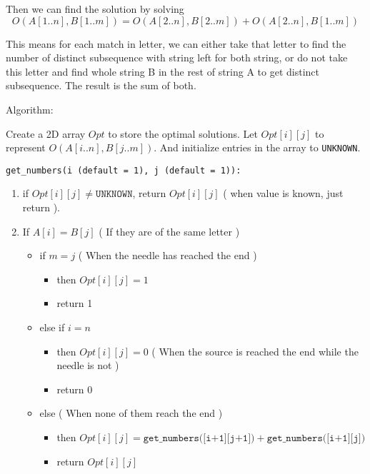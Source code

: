 \documentclass{article}
\begin{document}
Then we can find the solution by solving $$ O(A[1 .. n], B[1 .. m]) = O(A[2 .. n], B[2 .. m]) + O(A[2 .. n], B[1 .. m])$$

This means for each match in letter, we can either take that letter to find the number of distinct subsequence with string left for both string, or do not take this letter and find whole string B in the rest of string A to get distinct subsequence. The result is the sum of both.


Algorithm:

Create a 2D array $Opt$ to store the optimal solutions. Let $Opt[i][j]$ to represent $O(A[i .. n], B[j .. m])$. And initialize entries in the array to \texttt{UNKNOWN}.\pagebreak

\texttt{get\_numbers(i (default = 1), j (default = 1)):}
\begin{enumerate}
\item if $Opt[i][j] \neq \texttt{UNKNOWN}$, return $Opt[i][j]$ ( when value is known, just return ).
\item If $A[i] = B[j]$ ( If they are of the same letter )

  \begin{itemize}

  \item if $m=j$ ( When the needle has reached the end )

    \begin{itemize}
    \item then $Opt[i][j] = 1$
    \item return 1
    \end{itemize}

  \item else if $i=n$

    \begin{itemize}
    \item then $Opt[i][j] = 0$ ( When the source is reached the end while the needle is not )
    \item return 0
    \end{itemize}

  \item else ( When none of them reach the end )

    \begin{itemize}
    \item then $Opt[i][j] =\texttt{get\_numbers([i+1][j+1])} + \texttt{get\_numbers([i+1][j])}$
    \item return $Opt[i][j]$
    \end{itemize}


\end{itemize}
\end{enumerate}
\end{document}
